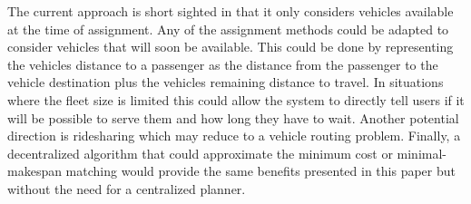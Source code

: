\documentclass[letterpaper]{article}
\begin{document}
The current approach is short sighted in that it only considers vehicles available at the time of assignment. Any of the assignment methods could be adapted to consider vehicles that will soon be available. This could be done by representing the vehicles distance to a passenger as the distance from the passenger to the vehicle destination plus the vehicles remaining distance to travel. In situations where the fleet size is limited this could allow the system to directly tell users if it will be possible to serve them and how long they have to wait. Another potential direction is ridesharing which may reduce to a vehicle routing problem. Finally, a decentralized algorithm that could approximate the minimum cost or minimal-makespan matching would provide the same benefits presented in this paper but without the need for a centralized planner.



\end{document}
